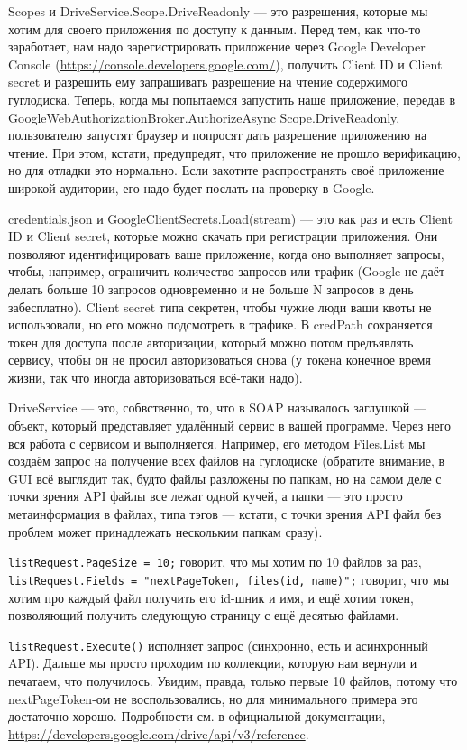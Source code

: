\documentclass[a5paper]{article}
\begin{document}
Scopes и DriveService.Scope.DriveReadonly --- это разрешения, которые мы хотим для своего приложения по доступу к данным. Перед тем, как что-то заработает, нам надо зарегистрировать приложение через Google Developer Console (\url{https://console.developers.google.com/}), получить Client ID и Client secret и разрешить ему запрашивать разрешение на чтение содержимого гуглодиска. Теперь, когда мы попытаемся запустить наше приложение, передав в GoogleWebAuthorizationBroker.AuthorizeAsync Scope.DriveReadonly, пользователю запустят браузер и попросят дать разрешение приложению на чтение. При этом, кстати, предупредят, что приложение не прошло верификацию, но для отладки это нормально. Если захотите распространять своё приложение широкой аудитории, его надо будет послать на проверку в Google.

credentials.json и GoogleClientSecrets.Load(stream) --- это как раз и есть Client ID и Client secret, которые можно скачать при регистрации приложения. Они позволяют идентифицировать ваше приложение, когда оно выполняет запросы, чтобы, например, ограничить количество запросов или трафик (Google не даёт делать больше 10 запросов одновременно и не больше N запросов в день забесплатно). Client secret типа секретен, чтобы чужие люди ваши квоты не использовали, но его можно подсмотреть в трафике. В credPath сохраняется токен для доступа после авторизации, который можно потом предъявлять сервису, чтобы он не просил авторизоваться снова (у токена конечное время жизни, так что иногда авторизоваться всё-таки надо).

DriveService --- это, собвственно, то, что в SOAP называлось заглушкой --- объект, который представляет удалённый сервис в вашей программе. Через него вся работа с сервисом и выполняется. Например, его методом Files.List мы создаём запрос на получение всех файлов на гуглодиске (обратите внимание, в GUI всё выглядит так, будто файлы разложены по папкам, но на самом деле с точки зрения API файлы все лежат одной кучей, а папки --- это просто метаинформация в файлах, типа тэгов --- кстати, с точки зрения API файл без проблем может принадлежать нескольким папкам сразу).

\texttt{listRequest.PageSize = 10;} говорит, что мы хотим по 10 файлов за раз, \texttt{listRequest.Fields = "nextPageToken, files(id, name)";} говорит, что мы хотим про каждый файл получить его id-шник и имя, и ещё хотим токен, позволяющий получить следующую страницу с ещё десятью файлами.

\texttt{listRequest.Execute()} исполняет запрос (синхронно, есть и асинхронный API). Дальше мы просто проходим по коллекции, которую нам вернули и печатаем, что получилось. Увидим, правда, только первые 10 файлов, потому что nextPageToken-ом не воспользовались, но для минимального примера это достаточно хорошо. Подробности см. в официальной документации, \url{https://developers.google.com/drive/api/v3/reference}.
\end{document}
